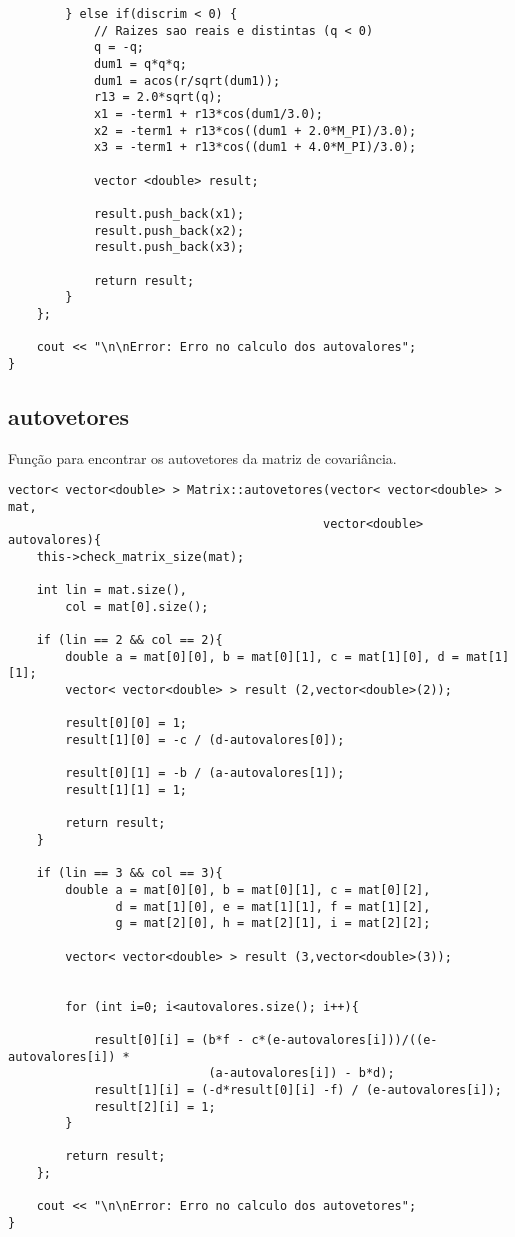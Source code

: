 \documentclass[a4paper, 11pt]{article}
\begin{document}
\begin{lstlisting}
		} else if(discrim < 0) {
			// Raizes sao reais e distintas (q < 0) 
		    q = -q; 
		    dum1 = q*q*q; 
		    dum1 = acos(r/sqrt(dum1)); 
		    r13 = 2.0*sqrt(q); 
		    x1 = -term1 + r13*cos(dum1/3.0); 
		    x2 = -term1 + r13*cos((dum1 + 2.0*M_PI)/3.0); 
		    x3 = -term1 + r13*cos((dum1 + 4.0*M_PI)/3.0); 

			vector <double> result;

			result.push_back(x1);
			result.push_back(x2);
			result.push_back(x3);
		
			return result;		
		} 			
	};
	
	cout << "\n\nError: Erro no calculo dos autovalores";
}
\end{lstlisting}

\subsection*{autovetores}
Função para encontrar os autovetores da matriz de covariância.

\begin{lstlisting}
vector< vector<double> > Matrix::autovetores(vector< vector<double> > mat, 
											vector<double> autovalores){
	this->check_matrix_size(mat);
	
	int lin = mat.size(), 
		col = mat[0].size();
	
	if (lin == 2 && col == 2){
		double a = mat[0][0], b = mat[0][1], c = mat[1][0], d = mat[1][1];
		vector< vector<double> > result (2,vector<double>(2)); 

		result[0][0] = 1;
		result[1][0] = -c / (d-autovalores[0]);

		result[0][1] = -b / (a-autovalores[1]);
		result[1][1] = 1;
		
		return result;
	}

	if (lin == 3 && col == 3){
		double a = mat[0][0], b = mat[0][1], c = mat[0][2], 
			   d = mat[1][0], e = mat[1][1], f = mat[1][2], 
			   g = mat[2][0], h = mat[2][1], i = mat[2][2];
			   
		vector< vector<double> > result (3,vector<double>(3)); 


		for (int i=0; i<autovalores.size(); i++){

			result[0][i] = (b*f - c*(e-autovalores[i]))/((e-autovalores[i]) * 
							(a-autovalores[i]) - b*d);
			result[1][i] = (-d*result[0][i] -f) / (e-autovalores[i]);
			result[2][i] = 1;
		}
		
		return result;
	};
	
	cout << "\n\nError: Erro no calculo dos autovetores";
}	
\end{lstlisting}
\end{document}
